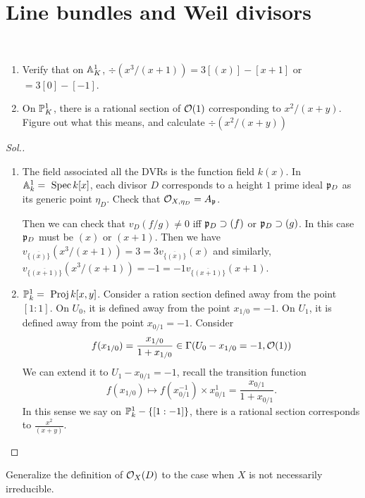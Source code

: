 \documentclass[11pt]{book} %
\begin{document}
\section{Line bundles and Weil divisors}
\begin{exr}\ 
\begin{enumerate}[label=(\alph*)]
\item Verify that on $\mathbb A^1_K$, $\div(x^3/(x+1))=3[(x)]-[x+1]$ or $=3[0]-[-1]$.
\item On $\mathbb P^1_K$, there is a rational section of ${\cal O}(1)$ corresponding to $x^2/(x+y)$. Figure out what this means, and calculate $\div(x^2/(x+y))$
\end{enumerate}
\end{exr}
\begin{proof}[Sol.]
\begin{enumerate}[label=(\alph*)]
\item The field associated all the DVRs is the function field $k(x)$. In $\mathbb A^1_k=\text{ Spec\,} k[x]$, each divisor $D$ corresponds to a height $1$ prime ideal ${\mathfrak p}_D$ as its generic point $\eta_D$.
Check that ${\cal O}_{X,\eta_D}=A_{\mathfrak p}$.
 
Then we can check that $v_D(f/g)\neq 0$ iff ${\mathfrak p}_D\supset (f)$ or ${\mathfrak p}_D\supset (g)$. In this  case ${\mathfrak p}_D$ must be $(x)$ or $(x+1)$. Then we have $v_{\overline{\{(x)\}}}(x^3/(x+1))=3=3v_{\overline{\{(x)\}}}(x)$ and similarly,$v_{\overline{\{(x+1)\}}}(x^3/(x+1))=-1=-1v_{\overline{\{(x+1)\}}}(x+1)$.
\item $\mathbb P^1_k=\text{ Proj\,} k[x,y]$. Consider a ration section defined away from the point $[1:1]$. On $U_0$, it is defined away from the point $x_{1/0}=-1$. On $U_1$, it is defined away from the point $x_{0/1}=-1$. Consider 
$$
f(x_{1/0})=\frac{x_{1/0}}{1+x_{1/0}}\in \Gamma(U_0-{x_{1/0}=-1},{\cal O}(1))
$$
We can extend it to $U_1-{x_{0/1}=-1}$, recall the transition function
$$
f(x_{1/0})\mapsto f(x_{0/1}^{-1})\times x_{0/1}^1=\frac{x_{0/1}}{1+x_{0/1}}.
$$
In this sense we say on $\mathbb P^1_k-\{[1:-1]\}$, there is a rational section corresponds to $\frac{x^2}{(x+y)}$.
\end{enumerate}
\end{proof}
\begin{exr}
Generalize the definition of ${\cal O}_X(D)$ to the case when $X$ is not necessarily irreducible.
\end{exr}
\end{document}

